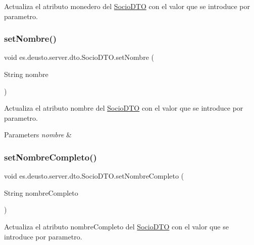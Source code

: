 Actualiza el atributo monedero del \mbox{\hyperlink{classes_1_1deusto_1_1server_1_1dto_1_1_socio_d_t_o}{Socio\+D\+TO}} con el valor que se introduce por parametro. \mbox{\label{classes_1_1deusto_1_1server_1_1dto_1_1_socio_d_t_o_aab44998d8490c38239063ea51b66ce52}} 
\subsubsection{\texorpdfstring{setNombre()}{setNombre()}}
{\footnotesize\ttfamily void es.\+deusto.\+server.\+dto.\+Socio\+D\+T\+O.\+set\+Nombre (\begin{DoxyParamCaption}\item[{String}]{nombre }\end{DoxyParamCaption})}

Actualiza el atributo nombre del \mbox{\hyperlink{classes_1_1deusto_1_1server_1_1dto_1_1_socio_d_t_o}{Socio\+D\+TO}} con el valor que se introduce por parametro. 
\begin{DoxyParams}{Parameters}
{\em nombre} & \\
\hline
\end{DoxyParams}
\mbox{\label{classes_1_1deusto_1_1server_1_1dto_1_1_socio_d_t_o_afb76400b33aeb967356abcd694559a7a}} 
\subsubsection{\texorpdfstring{setNombreCompleto()}{setNombreCompleto()}}
{\footnotesize\ttfamily void es.\+deusto.\+server.\+dto.\+Socio\+D\+T\+O.\+set\+Nombre\+Completo (\begin{DoxyParamCaption}\item[{String}]{nombre\+Completo }\end{DoxyParamCaption})}

Actualiza el atributo nombre\+Completo del \mbox{\hyperlink{classes_1_1deusto_1_1server_1_1dto_1_1_socio_d_t_o}{Socio\+D\+TO}} con el valor que se introduce por parametro. \mbox{\label{classes_1_1deusto_1_1server_1_1dto_1_1_socio_d_t_o_af2afe199fc47d9e2da33121892600e21}} 
